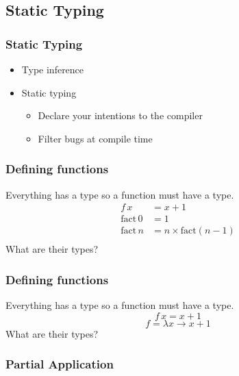\documentclass{beamer}
\begin{document}
\subsection{Static Typing}

\begin{frame}[fragile]
  \frametitle{Static Typing}
  \begin{itemize}
  \item Type inference
  \item Static typing
    \begin{itemize}
    \item Declare your intentions to the compiler
    \item Filter bugs at compile time
    \end{itemize}
  \end{itemize}
\end{frame}

\begin{frame}[fragile]
  \frametitle{Defining functions}
  Everything has a type so a function must have a type.
  $$
  \begin{aligned}
    f\, x             &= x + 1 \\
    \textrm{fact}\, 0 &= 1 \\
    \textrm{fact}\, n &= n \times \textrm{fact} (n - 1) \\
  \end{aligned}
  $$
  What are their types?
\end{frame}


\begin{frame}[fragile]
  \frametitle{Defining functions}
  Everything has a type so a function must have a type.
  $$
  f\, x = x + 1
  $$
  $$
  f = \lambda x \longrightarrow x + 1
  $$
  What are their types?
\end{frame}


\begin{frame}[fragile]
  \frametitle{Partial Application}
\end{frame}
\end{document}
